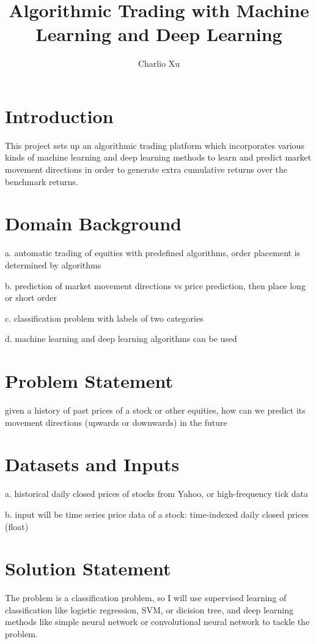 \documentclass[11pt]{article} %
\title{Algorithmic Trading with Machine Learning and Deep Learning}
\author{Charlio Xu}
\begin{document}
\maketitle

\section{Introduction}
This project sets up an algorithmic trading platform which incorporates various kinds of machine learning and deep learning methods to learn and predict market movement directions in order to generate extra cumulative returns over the benchmark returns.


\section{Domain Background}

a. automatic trading of equities with predefined algorithms, order placement is determined by algorithms 

b. prediction of market movement directions vs price prediction, then place long or short order

c. classification problem with labels of two categories

d. machine learning and deep learning algorithms can be used




\section{Problem Statement}

given a history of past prices of a stock or other equities, how can we predict its movement directions (upwards or downwards) in the future 


\section{Datasets and Inputs}

a. historical daily closed prices of stocks from Yahoo, or high-frequency tick data

b. input will be time series price data of a stock: time-indexed daily closed prices (float)


\section{Solution Statement}

The problem is a classification problem, so I will use supervised learning of classification like logistic regression, SVM, or dicision tree, and deep learning methods like simple neural network or convolutional neural network to tackle the problem.
\end{document}
